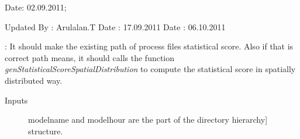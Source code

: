 \documentclass[letterpaper,10pt,english]{sphinxmanual}
\begin{document}
Date: 02.09.2011;

Updated By : Arulalan.T
Date : 17.09.2011
Date : 06.10.2011

\begin{fulllineitems}
\label{diagnosis:compute_season_stati_score_spatial_distribution.genStatisticalScorePath}
: It should make the existing path of
process files statistical score. Also if that is correct path means, it
should calls the function \emph{genStatisticalScoreSpatialDistribution} to
compute the statistical score in spatially distributed way.
\begin{description}
\item[{Inputs}] \leavevmode{[}modelname and modelhour are the part of the directory hierarchy{]}
structure.

\end{description}

\end{fulllineitems}

\end{document}
